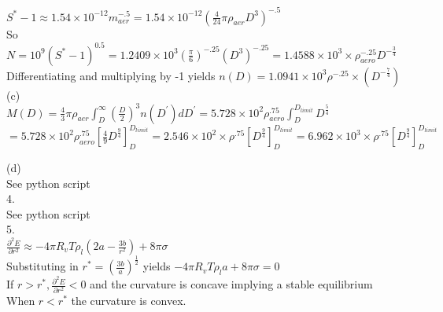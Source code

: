 \documentclass[11pt]{article} %
\begin{document}
$ S^{*} - 1 \approx 1.54 \times 10^{-12} m_{aer}^{-.5} = 1.54 \times 10^{-12} ( \frac{4}{24} \pi \rho_{aer}D^{3} )^{-.5} $\\

So $ N = 10^{9} (S^{*} - 1)^{0.5} = 1.2409 \times 10^{3} (\frac{\pi}{6})^{-.25} (D^{3})^{-.25}  = 1.4588 \times 10^{3} \times \rho_{aero}^{-.25} D^{-\frac{3}{4}}$\\ 

Differentiating and multiplying by -1 yields $ n(D) = 1.0941 \times 10^{3}\rho^{-.25} \times (D^{-\frac{7}{4}})$\\

(c)\\

$M(D) = \frac{4}{3} \pi \rho_{aer} \int_{D}^{\infty} (\frac{D}{2})^{3} n(D^{'}) dD^{'} = 5.728 \times 10^{2} \rho_{aero}^{.75} \int_{D}^{D_{limit}} D^{\frac{5}{4}} $\\

$ = 5.728 \times 10^{2} \rho_{aero}^{.75} [\frac{4}{9}D^{\frac{9}{4}}]_{D}^{D_{limit}} =2.546 \times 10^{2} \times \rho^{.75}[D^{\frac{9}{4}}]_{D}^{D_{limit}} = 6.962 \times 10^{3} \times \rho^{.75}[D^{\frac{9}{4}}]_{D}^{D_{limit}}$

(d)\\

See python script\\

4.\\

See python script\\

5.\\

$\frac{\partial^{2} E}{\partial r^{2}} \approx -4 \pi R_{v} T \rho_{l}(2a - \frac{3b}{r^{2}}) + 8\pi \sigma$ \\

Substituting in $r^{*} = (\frac{3b}{a})^{\frac{1}{2}}$ yields $-4 \pi R_{v} T \rho_{l} a + 8 \pi \sigma = 0$\\

If $r > r^{*}, \frac{\partial^{2} E}{\partial r^{2}} < 0$ and the curvature is concave implying a stable equilibrium\\

When $r < r^{*}$ the curvature is convex.
\end{document}
